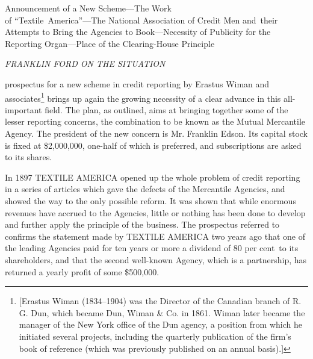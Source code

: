 \documentclass[openany,nobib]{tufte-book}
\begin{document}
\vspace{0.4in}
\begin{center}
    
\begin{spacing}{1.25}


{\LARGE Announcement of a New Scheme---The Work\\ of ``Textile~America''---The
National Association of Credit Men and~their Attempts to Bring the
Agencies to Book---Necessity of Publicity for the Reporting
Organ---Place of the Clearing-House Principle}

\end{spacing}

\vspace{0.25in}

{\LARGE \emph{FRANKLIN FORD ON THE SITUATION}}

\vspace{0.15in}

\enlargethispage{\baselineskip}

\end{center}

 prospectus for a new scheme in credit reporting by
Erastus Wiman and associates\footnote{{[}Erastus Wiman (1834--1904) was
  the Director of the Canadian branch of R. G. Dun, which became Dun,
  Wiman \& Co. in 1861. Wiman later became the manager of the New York
  office of the Dun agency, a position from which he initiated several
  projects, including the quarterly publication of the firm's book of
  reference (which was previously published on an annual basis).{]}}
brings up again the growing necessity of a clear advance in this
all-important field. The plan, as outlined, aims at bringing together
some of the lesser reporting concerns, the combination to be known as
the Mutual Mercantile Agency. The president of the new concern is Mr.
Franklin Edson. Its capital stock is fixed at \$2,000,000, one-half of
which is preferred, and subscriptions are asked to its shares.~

In 1897 TEXTILE AMERICA opened up the whole problem of credit reporting
in a series of articles which gave the defects of the Mercantile
Agencies, and showed the way to the only possible reform. It was shown
that while enormous revenues have accrued to the Agencies, little or
nothing has been done to develop and further apply the principle of the
business. The prospectus referred to confirms the statement made by
TEXTILE AMERICA two years ago that one of the leading Agencies paid for
ten years or more a dividend of 80 per cent~to its shareholders, and
that the second well-known Agency, which is a partnership, has returned
a yearly profit of some \$500,000.~
\end{document}

